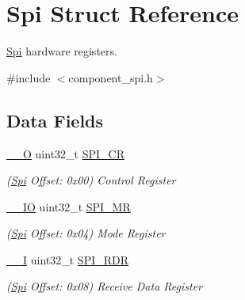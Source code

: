 \hypertarget{structSpi}{}\section{Spi Struct Reference}
\label{structSpi}


\mbox{\hyperlink{structSpi}{Spi}} hardware registers.  




{\ttfamily \#include $<$component\+\_\+spi.\+h$>$}

\subsection*{Data Fields}
\begin{DoxyCompactItemize}
\item 
\mbox{\label{structSpi_ad734fbd4fd26168d4677c0620e5efc02}} 
\mbox{\hyperlink{core__cm7_8h_a7e25d9380f9ef903923964322e71f2f6}{\+\_\+\+\_\+O}} uint32\+\_\+t \mbox{\hyperlink{structSpi_ad734fbd4fd26168d4677c0620e5efc02}{S\+P\+I\+\_\+\+CR}}
\begin{DoxyCompactList}\small\item\em (\mbox{\hyperlink{structSpi}{Spi}} Offset\+: 0x00) Control Register \end{DoxyCompactList}\item 
\mbox{\label{structSpi_a648508291f5d4893e6e85546bcf153db}} 
\mbox{\hyperlink{core__cm7_8h_aec43007d9998a0a0e01faede4133d6be}{\+\_\+\+\_\+\+IO}} uint32\+\_\+t \mbox{\hyperlink{structSpi_a648508291f5d4893e6e85546bcf153db}{S\+P\+I\+\_\+\+MR}}
\begin{DoxyCompactList}\small\item\em (\mbox{\hyperlink{structSpi}{Spi}} Offset\+: 0x04) Mode Register \end{DoxyCompactList}\item 
\mbox{\label{structSpi_af9e9f674383afb8c517e99b44a4fc9eb}} 
\mbox{\hyperlink{core__cm7_8h_af63697ed9952cc71e1225efe205f6cd3}{\+\_\+\+\_\+I}} uint32\+\_\+t \mbox{\hyperlink{structSpi_af9e9f674383afb8c517e99b44a4fc9eb}{S\+P\+I\+\_\+\+R\+DR}}
\begin{DoxyCompactList}\small\item\em (\mbox{\hyperlink{structSpi}{Spi}} Offset\+: 0x08) Receive Data Register \end{DoxyCompactList}\item 
\mbox{\label{structSpi_a8c8f55ee122f6b0ad33d438a4f1ff1ef}} 

\end{DoxyCompactItemize}
